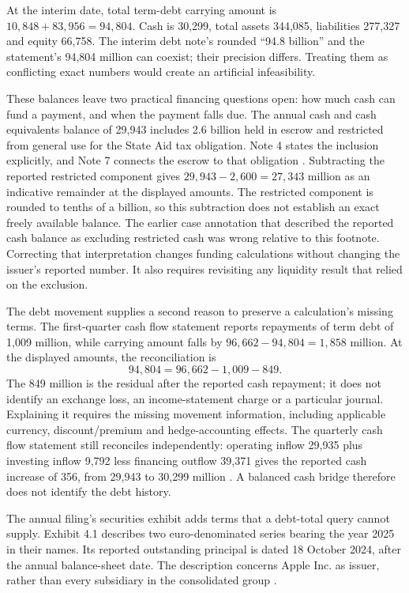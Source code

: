 At the interim date, total term-debt carrying amount is
$10{,}848+83{,}956=94{,}804$. Cash is 30,299, total assets 344,085,
liabilities 277,327 and equity 66,758. The interim debt note's rounded
``94.8 billion'' and the statement's 94,804 million can coexist; their
precision differs. Treating them as conflicting exact numbers would create
an artificial infeasibility.

These balances leave two practical financing questions open: how much cash can
fund a payment, and when the payment falls due. The annual cash and cash
equivalents balance of 29,943 includes 2.6 billion held in escrow and restricted
from general use for the State Aid tax obligation. Note 4 states the inclusion
explicitly, and Note 7 connects the escrow to that obligation
\citep[Notes 4 and 7, printed pp.~37 and 39]{apple2024}. Subtracting the reported
restricted component gives $29{,}943-2{,}600=27{,}343$ million as an indicative
remainder at the displayed amounts. The restricted component is rounded to
tenths of a billion, so this subtraction does not establish an exact freely
available balance. The earlier case annotation that described the reported
cash balance as excluding restricted cash was wrong relative to this footnote.
Correcting that interpretation changes funding calculations without changing
the issuer's reported number. It also requires revisiting any liquidity result
that relied on the exclusion.

The debt movement supplies a second reason to preserve a calculation's missing
terms. The first-quarter cash flow statement reports repayments of term debt of
1,009 million, while carrying amount falls by
$96{,}662-94{,}804=1{,}858$ million. At the displayed amounts, the reconciliation is
\[
       94{,}804=96{,}662-1{,}009-849.
\]
The 849 million is the residual after the reported cash repayment; it does not
identify an exchange loss, an income-statement charge or a particular journal.
Explaining it requires the missing movement information, including applicable
currency, discount/premium and hedge-accounting effects. The quarterly cash
flow statement still reconciles independently: operating inflow 29,935 plus
investing inflow 9,792 less financing outflow 39,371 gives the reported cash
increase of 356, from 29,943 to 30,299 million
\citep[statement of cash flows and Note 6]{apple2025q1}. A balanced cash bridge
therefore does not identify the debt history.

The annual filing's securities exhibit adds terms that a debt-total query
cannot supply. Exhibit 4.1 describes two euro-denominated series bearing the
year 2025 in their names. Its reported outstanding principal is dated
18 October 2024, after the annual balance-sheet date. The description concerns
Apple Inc. as issuer, rather than every subsidiary in the consolidated group
\citep[Exhibit 4.1, pp.~3--4]{apple2024}.

